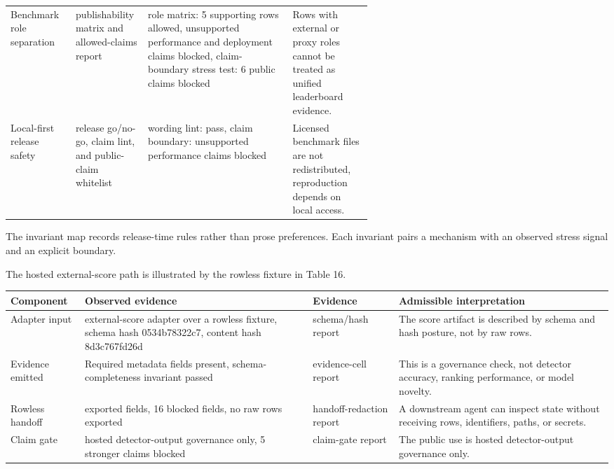 \documentclass[11pt]{article}
\begin{document}
\begin{center}
\begin{minipage}{\linewidth}
\begin{tabularx}{\linewidth}{@{}>{\raggedright\arraybackslash}p{0.18\linewidth} >{\raggedright\arraybackslash}p{0.20\linewidth} >{\raggedright\arraybackslash}X >{\raggedright\arraybackslash}p{0.22\linewidth}@{}}
Benchmark role separation & publishability matrix and allowed-claims report & role matrix: 5 supporting rows allowed, unsupported performance and deployment claims blocked, claim-boundary stress test: 6 public claims blocked & Rows with external or proxy roles cannot be treated as unified leaderboard evidence. \\
Local-first release safety & release go/no-go, claim lint, and public-claim whitelist & wording lint: pass, claim boundary: unsupported performance claims blocked & Licensed benchmark files are not redistributed, reproduction depends on local access. \\
\bottomrule
\end{tabularx}
\end{minipage}
\end{center}


The invariant map records release-time rules rather than prose preferences. Each invariant pairs a mechanism with an observed stress signal and an explicit boundary.

The hosted external-score path is illustrated by the rowless fixture in Table 16.

\begin{center}
\begin{minipage}{\linewidth}
\small
\setlength{\tabcolsep}{3pt}
\renewcommand{\arraystretch}{1.16}
\begin{tabularx}{\linewidth}{@{}>{\raggedright\arraybackslash}X >{\raggedright\arraybackslash}X >{\raggedright\arraybackslash}X >{\raggedright\arraybackslash}X@{}}
\toprule
Component & Observed evidence & Evidence & Admissible interpretation \\
\midrule
Adapter input & external-score adapter over a rowless fixture, schema hash 0534b78322c7, content hash 8d3c767fd26d & schema/hash report & The score artifact is described by schema and hash posture, not by raw rows. \\
Evidence emitted & Required metadata fields present, schema-completeness invariant passed & evidence-cell report & This is a governance check, not detector accuracy, ranking performance, or model novelty. \\
Rowless handoff & 11 exported fields, 16 blocked fields, no raw rows exported & handoff-redaction report & A downstream agent can inspect state without receiving rows, identifiers, paths, or secrets. \\
Claim gate & hosted detector-output governance only, 5 stronger claims blocked & claim-gate report & The public use is hosted detector-output governance only. \\
\bottomrule
\end{tabularx}
\end{minipage}
\end{center}
\end{document}
